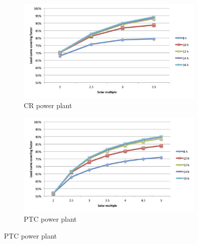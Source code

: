 \documentclass[Master,MEE,english]{twbook}%
\begin{document}
\begin{figure}[p]
        \centering   
        \begin{subfigure}[b]{0.75\textwidth}
                \centering
                \includegraphics[width=1.05\textwidth]{FIG/CR_LCCF}
                \caption{CR power plant}\label{CR_LCCF}
        \end{subfigure}%
        
\par\medskip %
                
        \begin{subfigure}[b]{0.75\textwidth}
                \centering
                \includegraphics[width=1.05\textwidth]{FIG/PTC_LCCF}
                \caption{PTC power plant}\label{PTC_LCCF}
        \end{subfigure}%

\par\medskip %
                

\end{figure}
\end{document}
